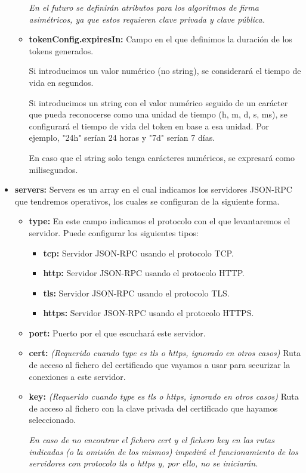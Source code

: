 \documentclass[spanish,12pt, a4paper, twoside]{paper}
\begin{document}
\begin{itemize}
\begin{itemize}
\emph{En el futuro se definirán atributos para los algoritmos de firma asimétricos, ya que estos requieren clave privada y clave pública.}

\item\textbf{tokenConfig.expiresIn:} Campo en el que definimos la duración de los tokens generados. 

Si introducimos un valor numérico (no string), se considerará el tiempo de vida en segundos. 

Si introducimos un string con el valor numérico seguido de un carácter que pueda reconocerse como una unidad de tiempo (h, m, d, s, ms), se configurará el tiempo de vida del token en base a esa unidad. Por ejemplo, "24h" serían 24 horas y "7d" serían 7 días. 

En caso que el string solo tenga carácteres numéricos, se expresará como milisegundos.
\end{itemize}

\item\textbf{servers:} Servers es un array en el cual indicamos los servidores JSON-RPC que tendremos operativos, los cuales se configuran de la siguiente forma.
\begin{itemize}
\item\textbf{type:} En este campo indicamos el protocolo con el que levantaremos el servidor. Puede configurar los siguientes tipos:
\begin{itemize}
\item\textbf{tcp:} Servidor JSON-RPC usando el protocolo TCP.
\item\textbf{http:} Servidor JSON-RPC usando el protocolo HTTP.
\item\textbf{tls:} Servidor JSON-RPC usando el protocolo TLS.
\item\textbf{https:} Servidor JSON-RPC usando el protocolo HTTPS.
\end{itemize}

\item\textbf{port:} Puerto por el que escuchará este servidor.
\item\textbf{cert:} \emph{(Requerido cuando type es tls o https, ignorado en otros casos)} Ruta de acceso al fichero del certificado que vayamos a usar para securizar la conexiones a este servidor.
\item\textbf{key:} \emph{(Requerido cuando type es tls o https, ignorado en otros casos)} Ruta de acceso al fichero con la clave privada del certificado que hayamos seleccionado.

\emph{En caso de no encontrar el fichero cert y el fichero key en las rutas indicadas (o la omisión de los mismos) impedirá el funcionamiento de los servidores con protocolo tls o https y, por ello, no se iniciarán.}
\end{itemize}


\end{itemize}
\end{document}
